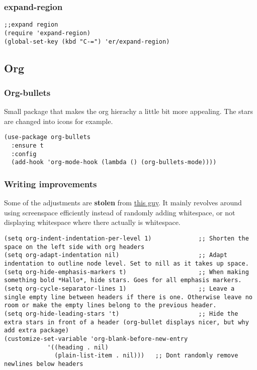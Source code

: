 \documentclass[11pt]{article}
\begin{document}
\subsubsection{expand-region}
\label{sec:org132d5e6}
\begin{verbatim}
;;expand region
(require 'expand-region)
(global-set-key (kbd "C-=") 'er/expand-region)
\end{verbatim}
\subsection{Org}
\label{sec:org47b0892}
\subsubsection{Org-bullets}
\label{sec:org03c97cd}
Small package that makes the org hierachy a little bit more appealing. The stars are changed into icons for example.
\begin{verbatim}
(use-package org-bullets
  :ensure t
  :config
  (add-hook 'org-mode-hook (lambda () (org-bullets-mode))))
\end{verbatim}
\subsubsection{Writing improvements}
\label{sec:org5ed7274}
Some of the adjustments are \textbf{stolen} from \href{https://explog.in/notes/writingsetup.html}{this guy}. It mainly revolves around using screenspace efficiently instead of randomly adding whitespace, or not displaying whitespace where there actually is whitespace.
\begin{verbatim}
(setq org-indent-indentation-per-level 1)             ;; Shorten the space on the left side with org headers
(setq org-adapt-indentation nil)                      ;; Adapt indentation to outline node level. Set to nill as it takes up space.
(setq org-hide-emphasis-markers t)                    ;; When making something bold *Hallo*, hide stars. Goes for all emphasis markers.
(setq org-cycle-separator-lines 1)                    ;; Leave a single empty line between headers if there is one. Otherwise leave no room or make the empty lines belong to the previous header.
(setq org-hide-leading-stars 't)                      ;; Hide the extra stars in front of a header (org-bullet displays nicer, but why add extra package)
(customize-set-variable 'org-blank-before-new-entry
			'((heading . nil)
			  (plain-list-item . nil)))   ;; Dont randomly remove newlines below headers
\end{verbatim}
\end{document}
